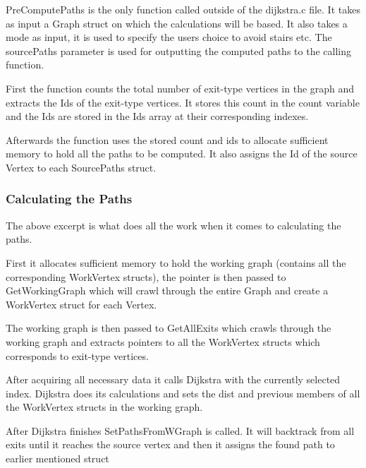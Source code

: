 PreComputePaths is the only function called outside of the dijkstra.c file. It takes as input a Graph struct on which the calculations will be based. It also takes a mode as input, it is used to specify the users choice to avoid stairs etc. The sourcePaths parameter is used for outputting the computed paths to the calling function.



First the function counts the total number of exit-type vertices in the graph and extracts the Ids of the exit-type vertices. It stores this count in the count variable and the Ids are stored in the Ids array at their corresponding indexes.



Afterwards the function uses the stored count and ids to allocate sufficient memory to hold all the paths to be computed. It also assigns the Id of the source Vertex to each SourcePaths struct.

\subsubsection{Calculating the Paths}



The above excerpt is what does all the work when it comes to calculating the paths.

First it allocates sufficient memory to hold the working graph (contains all the corresponding WorkVertex structs), the pointer is then passed to GetWorkingGraph which will crawl through the entire Graph and create a WorkVertex struct for each Vertex.

The working graph is then passed to GetAllExits which crawls through the working graph and extracts pointers to all the WorkVertex structs which corresponds to exit-type vertices.

After acquiring all necessary data it calls Dijkstra with the currently selected index. Dijkstra does its calculations and sets the dist and previous members of all the WorkVertex structs in the working graph.

After Dijkstra finishes SetPathsFromWGraph is called. It will backtrack from all exits until it reaches the source vertex and then it assigns the found path to earlier mentioned struct 